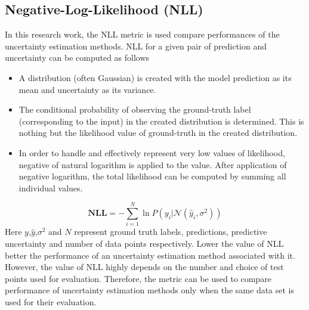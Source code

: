 \subsection{Negative-Log-Likelihood (NLL)}
In this research work, the NLL metric is used compare performances of the uncertainty estimation methods. NLL for a given pair of prediction and uncertainty can be computed as follows
\begin{itemize}
	\item A distribution (often Gaussian) is created with the model prediction as its mean and uncertainty as its variance.
	\item The conditional probability of observing the ground-truth label (corresponding to the input) in the created distribution is determined. This is nothing but the likelihood value of ground-truth in the created distribution.
	\item  In order to handle and effectively represent very low values of likelihood, negative of natural logarithm is applied  to the value. After application of negative logarithm, the total likelihood can be computed by summing all individual values.
\end{itemize}
\begin{equation}
	\mathbf{NLL} = -\sum_{i=1}^{N}\ln P(y_i|\mathcal{N}(\hat{y}_i,\sigma^2)) 
\end{equation}
Here $y$,$\hat{y}$,$\sigma^2$ and $N$ represent ground truth labels, predictions, predictive uncertainty and number of data points respectively.
Lower the value of NLL better the performance of an uncertainty estimation method associated with it. However, the value of NLL highly depends on the number and choice of test points used for evaluation. Therefore, the metric can be used to compare performance of uncertainty estimation methods only when the same data set is used for their evaluation.
